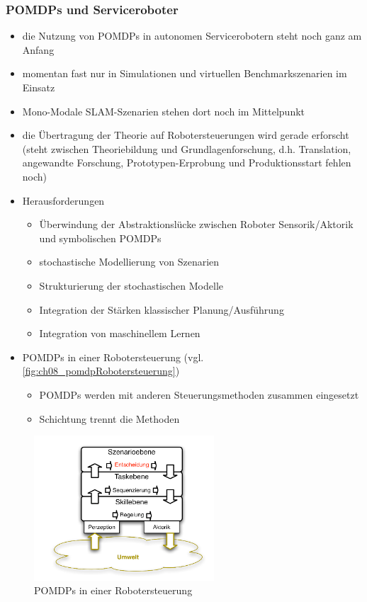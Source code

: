 \subsubsection{POMDPs und Serviceroboter}
\begin{itemize}
	\item die Nutzung von POMDPs in autonomen Servicerobotern steht noch ganz am Anfang
	\item momentan fast nur in Simulationen und virtuellen Benchmarkszenarien im Einsatz
	\item Mono-Modale SLAM-Szenarien stehen dort noch im Mittelpunkt
	\item die \"Ubertragung der Theorie auf Robotersteuerungen wird gerade erforscht (steht zwischen Theoriebildung und Grundlagenforschung, d.h. Translation, angewandte Forschung, Prototypen-Erprobung und Produktionsstart fehlen noch)
	\item Herausforderungen
	\begin{itemize}
		\item \"Uberwindung der Abstraktionsl\"ucke zwischen Roboter Sensorik/Aktorik und symbolischen POMDPs
		\item stochastische Modellierung von Szenarien
		\item Strukturierung der stochastischen Modelle
		\item Integration der St\"arken klassischer Planung/Ausf\"uhrung
		\item Integration von maschinellem Lernen
	\end{itemize}
	\item POMDPs in einer Robotersteuerung (vgl. \autoref{fig:ch08_pomdpRobotersteuerung})
	\begin{itemize}
		\item POMDPs werden mit anderen Steuerungsmethoden zusammen eingesetzt
		\item Schichtung trennt die Methoden
	\end{itemize}
\end{itemize}

\begin{figure}
\centering
\includegraphics[width=0.6\textwidth]{figures/ch08_POMPDRobotersteuerung.png}
\caption{POMDPs in einer Robotersteuerung}
\label{fig:ch08_pomdpRobotersteuerung}
\end{figure}